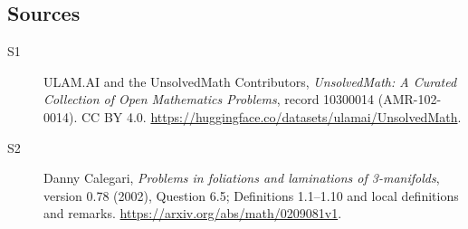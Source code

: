\documentclass[11pt]{article}
\begin{document}
\subsection{Sources}
\begin{description}
\item[\hypertarget{source:10300014:1}{S1}] ULAM.AI and the UnsolvedMath Contributors, \emph{UnsolvedMath: A Curated Collection of Open Mathematics Problems}, record 10300014 (AMR-102-0014). CC BY 4.0. \url{https://huggingface.co/datasets/ulamai/UnsolvedMath}.
\item[\hypertarget{source:10300014:2}{S2}] Danny Calegari, \emph{Problems in foliations and laminations of 3-manifolds}, version 0.78 (2002), Question 6.5; Definitions 1.1--1.10 and local definitions and remarks. \url{https://arxiv.org/abs/math/0209081v1}.
\end{description}
\label{end:10300014}
\end{document}
